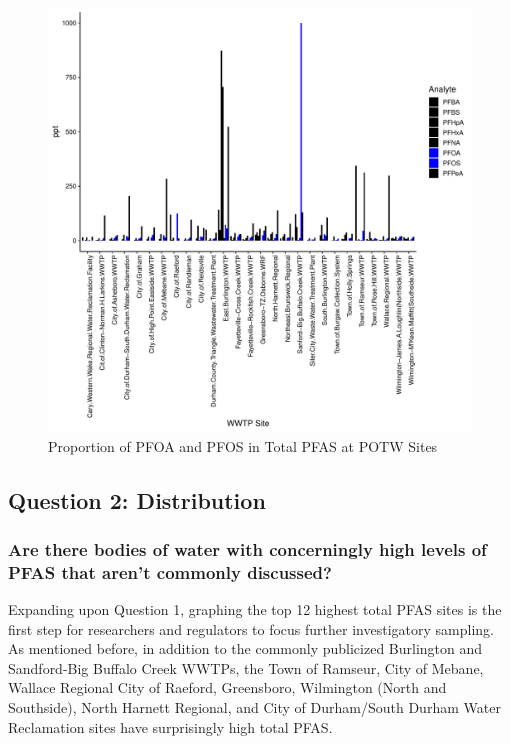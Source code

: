 \documentclass[
  12pt,
]{article}
\begin{document}
\begin{figure}

\includegraphics{PFAS_FinalProject_files/figure-latex/unnamed-chunk-22-1} \hfill{}

\caption{Proportion of PFOA and PFOS in Total PFAS at POTW Sites}\label{fig:unnamed-chunk-22}
\end{figure}

\hypertarget{question-2-distribution}{%
\subsection{Question 2: Distribution}\label{question-2-distribution}}

\hypertarget{are-there-bodies-of-water-with-concerningly-high-levels-of-pfas-that-arent-commonly-discussed}{%
\subsubsection{Are there bodies of water with concerningly high levels
of PFAS that aren't commonly
discussed?}\label{are-there-bodies-of-water-with-concerningly-high-levels-of-pfas-that-arent-commonly-discussed}}

Expanding upon Question 1, graphing the top 12 highest total PFAS sites
is the first step for researchers and regulators to focus further
investigatory sampling. As mentioned before, in addition to the commonly
publicized Burlington and Sandford-Big Buffalo Creek WWTPs, the Town of
Ramseur, City of Mebane, Wallace Regional City of Raeford, Greensboro,
Wilmington (North and Southside), North Harnett Regional, and City of
Durham/South Durham Water Reclamation sites have surprisingly high total
PFAS.
\end{document}
